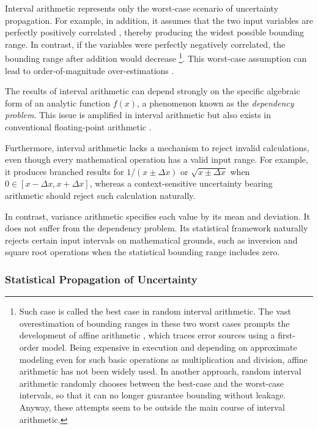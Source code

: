 \documentclass[twoside]{article}
\numberwithin{equation}{section}
\begin{document}
Interval arithmetic represents only the worst-case scenario of uncertainty propagation.  
For example, in addition, it assumes that the two input variables are perfectly positively correlated \cite{Affine_Arithmetic}, thereby producing the widest possible bounding range.  
In contrast, if the variables were perfectly negatively correlated, the bounding range after addition would decrease \cite{Random_Interval_Arithmetic}  
\footnote{
Such case is called the best case in random interval arithmetic.
The vast overestimation of bounding ranges in these two worst cases prompts the development of affine arithmetic \cite{Affine_Arithmetic}\cite{Affine_Arithmetic_book}, which traces error sources using a first-order model.  
Being expensive in execution and depending on approximate modeling even for such basic operations as multiplication and division, affine arithmetic has not been widely used.  
In another approach, random interval arithmetic \cite{Random_Interval_Arithmetic} randomly chooses between the best-case and the worst-case intervals, so that it can no longer guarantee bounding without leakage.  
Anyway, these attempts seem to be outside the main course of interval arithmetic.
}.
This worst-case assumption can lead to order-of-magnitude over-estimations \cite{Prev_Precision_Arithmetic}.

The results of interval arithmetic can depend strongly on the specific algebraic form of an analytic function $f(x)$, a phenomenon known as
the \emph{dependency problem}. This issue is amplified in interval arithmetic \cite{Interval_Arithmetic} but also exists in conventional floating-point arithmetic \cite{Numerical_Recipes}.  

Furthermore, interval arithmetic lacks a mechanism to reject invalid calculations, even though every mathematical operation has a valid input range.
For example, it produces branched results for $1/(x \pm \Delta x)$ or $\sqrt{x \pm \Delta x}$ when $0 \in [x - \Delta x, x + \Delta x]$, whereas a context-sensitive uncertainty bearing arithmetic should reject such calculation naturally.

In contrast, variance arithmetic specifies each value by its mean and deviation.
It does not suffer from the dependency problem.
Its statistical framework naturally rejects certain input intervals on mathematical grounds, such as inversion and square root operations when the statistical bounding range includes zero.


\subsubsection{Statistical Propagation of Uncertainty}
\end{document}
